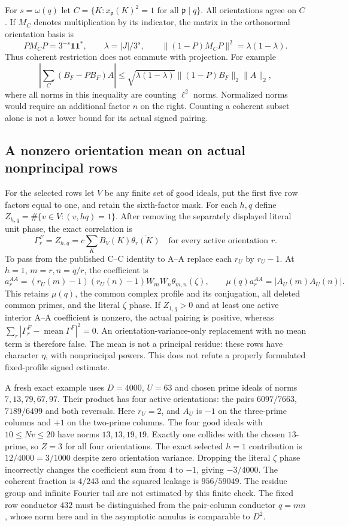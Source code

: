 \documentclass[11pt]{article}
\theoremstyle{definition}\newtheorem{definition}[theorem]{Definition}
\theoremstyle{remark}\newtheorem{remark}[theorem]{Remark}
\begin{document}
For $s=\omega(q)$ let $C=\{K:x_{\mathfrak p}(K)^2=1\text{ for all }
\mathfrak p\mid q\}$. All orientations agree on $C$. If $M_C$ denotes
multiplication by its indicator, the matrix in the orthonormal orientation
basis is
\[
 PM_CP=3^{-s}\mathbf1\mathbf1^*,\qquad
 \lambda=|J|/3^s,\qquad
 \|(1-P)M_CP\|^2=\lambda(1-\lambda).
\]
Thus coherent restriction does not commute with projection. For example
\[
 \left|\sum_C(B_F-PB_F)A\right|
 \le\sqrt{\lambda(1-\lambda)}\|(1-P)B_F\|_2\|A\|_2,
\]
where all norms in this inequality are counting $\ell^2$ norms. Normalized
norms would require an additional factor $n$ on the right. Counting a
coherent subset alone is not a lower bound for its actual signed pairing.

\subsection{A nonzero orientation mean on actual nonprincipal rows}
For the selected rows let $V$ be any finite set of good ideals, put the
first five row factors equal to one, and retain the sixth-factor mask.
For each $h,q$ define $Z_{h,q}=\#\{v\in V:(v,hq)=1\}$.
After removing the separately displayed literal unit phase, the exact
correlation is
\[
 \Gamma_r^F=Z_{h,q}
    =c\sum_KB_V(K)\overline{\theta_r(K)}
 \quad\text{for every active orientation }r.
\]
To pass from the published C--C identity to A--A replace each $r_U$ by
$r_U-1$. At $h=1$, $m=r,n=q/r$, the coefficient is
\[
 a_r^{AA}=(r_U(m)-1)(r_U(n)-1)W_m\overline{W_n}
                                   \theta_{m,n}(\zeta),
 \qquad \mu(q)a_r^{AA}=|A_U(m)A_U(n)|.
\]
This retains $\mu(q)$, the common complex profile and its conjugation,
all deleted common primes, and the literal $\zeta$ phase.
If $Z_{1,q}>0$ and at least one active interior A--A coefficient is
nonzero, the actual pairing is positive, whereas
$\sum_r|\Gamma_r^F-\operatorname{mean}\Gamma^F|^2=0$.
An orientation-variance-only replacement with no mean term is therefore
false. The mean is not a principal residue: these rows have character
$\eta$, with nonprincipal powers. This does not refute a properly
formulated fixed-profile signed estimate.

A fresh exact example uses $D=4000$, $U=63$ and chosen prime ideals of
norms $7,13,79,67,97$. Their product has four active orientations:
the pairs $6097/7663$, $7189/6499$ and both reversals.
Here $r_U=2$, and $A_U$ is $-1$ on the three-prime columns and $+1$ on
the two-prime columns. The four good ideals with $10\le Nv\le20$ have
norms $13,13,19,19$. Exactly one collides with the chosen $13$-prime,
so $Z=3$ for all four orientations. The exact selected $h=1$ contribution
is $12/4000=3/1000$ despite zero orientation variance.
Dropping the literal $\zeta$ phase incorrectly changes the coefficient
sum from $4$ to $-1$, giving $-3/4000$.
The coherent fraction is $4/243$ and the squared leakage is $956/59049$.
The residue group and infinite Fourier tail are not estimated by this
finite check. The fixed row conductor $432$ must be distinguished from
the pair-column conductor $q=mn$, whose norm here and in the asymptotic
annulus is comparable to $D^2$.
\end{document}
